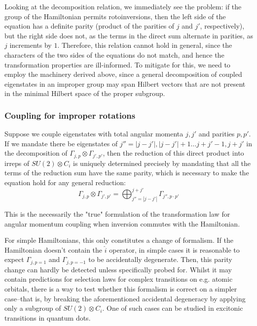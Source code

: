 \documentclass[12pt]{article}
\begin{document}
	Looking at the decomposition relation, we immediately see the problem: if the group of the Hamiltonian permits rotoinversions, then the left side of the equation has a definite parity (product of the parities of $j$ and $j'$, respectively), but the right side does not, as the terms in the direct sum alternate in parities, as $j$ increments by $1$. Therefore, this relation cannot hold in general, since the characters of the two sides of the equations do not match, and hence the transformation properties are ill-informed. To mitigate for this, we need to employ the machinery derived above, since a general decomposition of coupled eigenstates in an improper group may span Hilbert vectors that are not present in the minimal Hilbert space of the proper subgroup.
	
	\subsubsection{Coupling for improper rotations}
	
	Suppose we couple eigenstates with total angular momenta $j,j'$ and parities $p,p'$. If we mandate there be eigenstates of $j''=|j-j'|, |j-j'|+1\dots j+j'-1, j+j'$ in the decomposition of $\Gamma_{j,p}\otimes\Gamma_{j',p'}$, then the reduction of this direct product into irreps of $SU(2)\otimes C_i$ is uniquely determined precisely by mandating that all the terms of the reduction sum have the same parity, which is necessary to make the equation hold for any general reduction:
	$$\Gamma_{j,p}\otimes\Gamma_{j',p'}=\bigoplus_{j''=|j-j'|}^{j+j'}\Gamma_{j'',p\cdot p'}$$
	
	This is the necessarily the "true" formulation of the transformation law for angular momentum coupling when inversion commutes with the Hamiltonian.
	
	For simple Hamiltonians, this only constitutes a change of formalism. If the Hamiltonian doesn't contain the $\hat{i}$ operator, in simple cases it is reasonable to expect $\Gamma_{j,p=1}$ and $\Gamma_{j,p=-1}$ to be accidentally degenerate. Then, this parity change can hardly be detected unless specifically probed for. Whilst it may contain predictions for selection laws for complex transitions on e.g. atomic orbitals, there is a way to test whether this formalism is correct on a simpler case--that is, by breaking the aforementioned accidental degeneracy by applying only a subgroup of $SU(2)\otimes C_i$. One of such cases can be studied in excitonic transitions in quantum dots.
	
\end{document}
